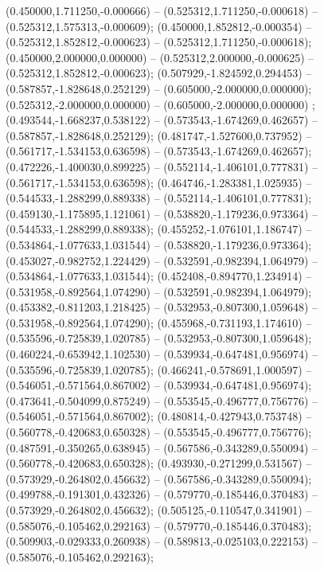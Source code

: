  (0.450000,1.711250,-0.000666) -- (0.525312,1.711250,-0.000618) -- (0.525312,1.575313,-0.000609);
 (0.450000,1.852812,-0.000354) -- (0.525312,1.852812,-0.000623) -- (0.525312,1.711250,-0.000618);
 (0.450000,2.000000,0.000000) -- (0.525312,2.000000,-0.000625) -- (0.525312,1.852812,-0.000623);
 (0.507929,-1.824592,0.294453) -- (0.587857,-1.828648,0.252129) -- (0.605000,-2.000000,0.000000);
 (0.525312,-2.000000,0.000000) -- (0.605000,-2.000000,0.000000) ;
 (0.493544,-1.668237,0.538122) -- (0.573543,-1.674269,0.462657) -- (0.587857,-1.828648,0.252129);
 (0.481747,-1.527600,0.737952) -- (0.561717,-1.534153,0.636598) -- (0.573543,-1.674269,0.462657);
 (0.472226,-1.400030,0.899225) -- (0.552114,-1.406101,0.777831) -- (0.561717,-1.534153,0.636598);
 (0.464746,-1.283381,1.025935) -- (0.544533,-1.288299,0.889338) -- (0.552114,-1.406101,0.777831);
 (0.459130,-1.175895,1.121061) -- (0.538820,-1.179236,0.973364) -- (0.544533,-1.288299,0.889338);
 (0.455252,-1.076101,1.186747) -- (0.534864,-1.077633,1.031544) -- (0.538820,-1.179236,0.973364);
 (0.453027,-0.982752,1.224429) -- (0.532591,-0.982394,1.064979) -- (0.534864,-1.077633,1.031544);
 (0.452408,-0.894770,1.234914) -- (0.531958,-0.892564,1.074290) -- (0.532591,-0.982394,1.064979);
 (0.453382,-0.811203,1.218425) -- (0.532953,-0.807300,1.059648) -- (0.531958,-0.892564,1.074290);
 (0.455968,-0.731193,1.174610) -- (0.535596,-0.725839,1.020785) -- (0.532953,-0.807300,1.059648);
 (0.460224,-0.653942,1.102530) -- (0.539934,-0.647481,0.956974) -- (0.535596,-0.725839,1.020785);
 (0.466241,-0.578691,1.000597) -- (0.546051,-0.571564,0.867002) -- (0.539934,-0.647481,0.956974);
 (0.473641,-0.504099,0.875249) -- (0.553545,-0.496777,0.756776) -- (0.546051,-0.571564,0.867002);
 (0.480814,-0.427943,0.753748) -- (0.560778,-0.420683,0.650328) -- (0.553545,-0.496777,0.756776);
 (0.487591,-0.350265,0.638945) -- (0.567586,-0.343289,0.550094) -- (0.560778,-0.420683,0.650328);
 (0.493930,-0.271299,0.531567) -- (0.573929,-0.264802,0.456632) -- (0.567586,-0.343289,0.550094);
 (0.499788,-0.191301,0.432326) -- (0.579770,-0.185446,0.370483) -- (0.573929,-0.264802,0.456632);
 (0.505125,-0.110547,0.341901) -- (0.585076,-0.105462,0.292163) -- (0.579770,-0.185446,0.370483);
 (0.509903,-0.029333,0.260938) -- (0.589813,-0.025103,0.222153) -- (0.585076,-0.105462,0.292163);
